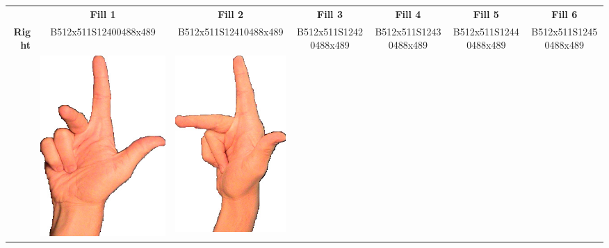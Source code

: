 \documentclass{article}
\begin{document}
\begin{center}
\begin{tabular}{r*{6}{c}}
&\textbf{Fill 1}&\textbf{Fill 2}&\textbf{Fill 3}&\textbf{Fill 4}&\textbf{Fill 5}&\textbf{Fill 6}\\
\multirow{2}{*}{\textbf{Right}}&
B512x511S12400488x489&
B512x511S12410488x489&
B512x511S12420488x489&
B512x511S12430488x489&
B512x511S12440488x489&
B512x511S12450488x489\\
&
\includegraphics[scale=0.1]{images/03-04-1.jpg}&
\includegraphics[scale=0.1]{images/03-04-2.jpg}&

\end{tabular}
\end{center}
\end{document}
